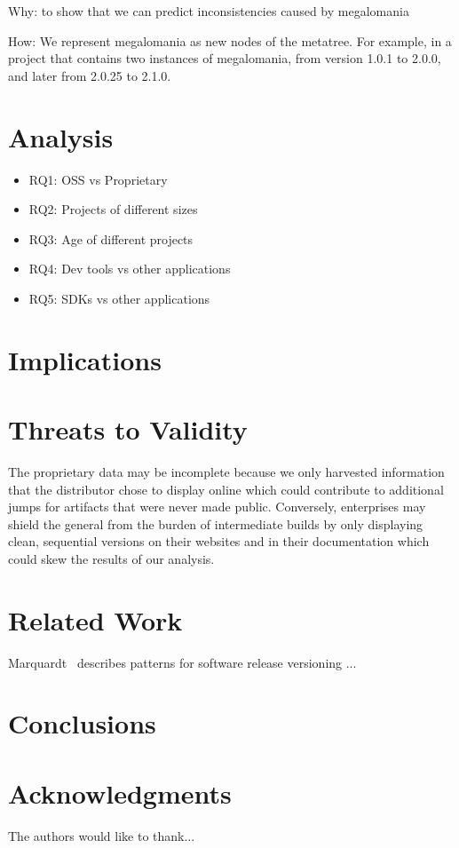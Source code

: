 \documentclass[conference]{IEEEtran}
\begin{document}
Why: to show that we can predict inconsistencies caused by megalomania

How: 
We represent megalomania as new nodes of the metatree.
For example, in a project that contains two instances of megalomania, from version 1.0.1 to 2.0.0, and later from 2.0.25 to 2.1.0.


\section{Analysis}

\begin{itemize}
\item RQ1: OSS vs Proprietary
\item RQ2: Projects of different sizes
\item RQ3: Age of different projects
\item RQ4: Dev tools vs other applications
\item RQ5: SDKs vs other applications 
\end{itemize}


\section{Implications}

\section{Threats to Validity}

 The proprietary data may be incomplete because we only harvested information that the distributor chose to display online which could contribute to additional jumps for artifacts that were never made public. Conversely, enterprises may shield the general from the burden of intermediate builds by only displaying clean, sequential versions on their websites and in their documentation which could skew the results of our analysis.



\section{Related Work}

Marquardt~\cite{Marquardt2010:EuroPLoP} describes patterns for software release versioning ...


\section{Conclusions}


\section*{Acknowledgments}

The authors would like to thank...

%

\end{document}
